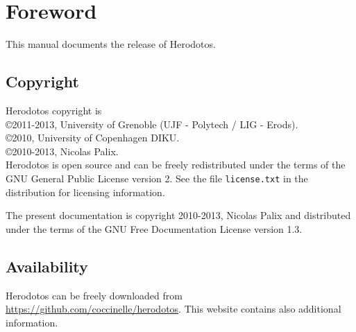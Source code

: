 
\chapter*{Foreword}

This manual documents the release \version of Herodotos.


\section*{Copyright}

Herodotos copyright is\\
\copyright 2011-2013, University of Grenoble (UJF - Polytech / LIG - Erods).\\
\copyright 2010, University of Copenhagen DIKU.\\
\copyright 2010-2013, Nicolas Palix.\\

Herodotos is open source and can be freely redistributed under the
terms of the GNU General Public License version 2. See the file
\texttt{license.txt} in the distribution for licensing information.

The present documentation is copyright 2010-2013, Nicolas Palix and
distributed under the terms of the GNU Free Documentation License
version 1.3.

\section*{Availability}

Herodotos can be freely downloaded
from \url{https://github.com/coccinelle/herodotos}.
This website contains also additional information.


